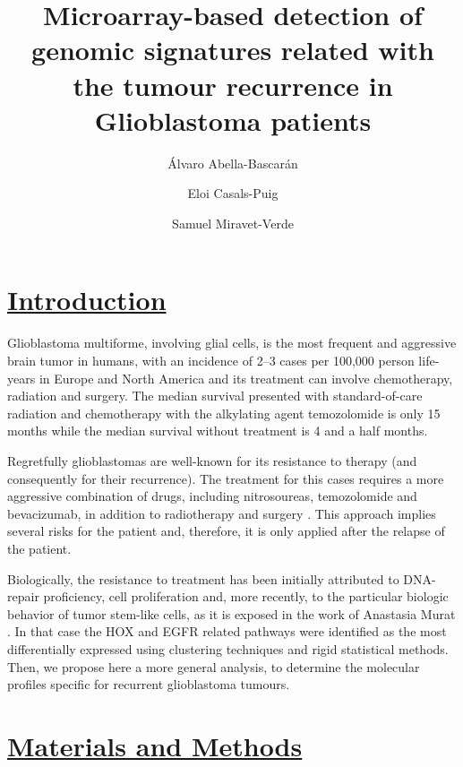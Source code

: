\documentclass[9pt,twocolumn,twoside]{gsajnl}
\title{Microarray-based detection of genomic signatures related with the tumour recurrence in Glioblastoma patients}
\author[$\ast$,1]{Álvaro Abella-Bascarán}
\author[$\ast$]{Eloi Casals-Puig}
\author[$\ast$]{Samuel Miravet-Verde}
\affil[$\ast$]{Pompeu Fabra University, Barcelona (Spain)}
\begin{document}
\maketitle
\thispagestyle{firststyle}
\marginmark
\firstpagefootnote
{}

\vspace{-1cm}
\section*{\underline{Introduction}}



Glioblastoma multiforme, involving glial cells, is the most frequent and aggressive brain tumor in humans, with an incidence of 2–3 cases per 100,000 person life-years in Europe and North America \citep{Bleeker2012} and its treatment can involve chemotherapy, radiation and surgery. The median survival presented with standard-of-care radiation and chemotherapy with the alkylating agent temozolomide is only 15 months  \citep{Johnson2012} while the median survival without treatment is 4 and a half months. 

Regretfully glioblastomas are well-known for its resistance to therapy (and consequently for their recurrence). The treatment for this cases requires a more aggressive combination of drugs, including nitrosoureas, temozolomide and bevacizumab, in addition to radiotherapy and surgery \citep{Weller2013}. This approach implies several risks for the patient and, therefore, it is only applied after the relapse of the patient.

Biologically, the resistance to treatment has been initially attributed to DNA-repair proficiency, cell proliferation and, more recently, to the particular biologic behavior of tumor stem-like cells, as it is exposed in the work of Anastasia Murat \citep{Murat2008}. In that case the HOX and EGFR related pathways were identified as the most differentially expressed using clustering techniques and rigid statistical methods. Then, we propose here a more general analysis, to determine the molecular profiles specific for recurrent glioblastoma tumours.

\section*{\underline{Materials and Methods}}
\end{document}
